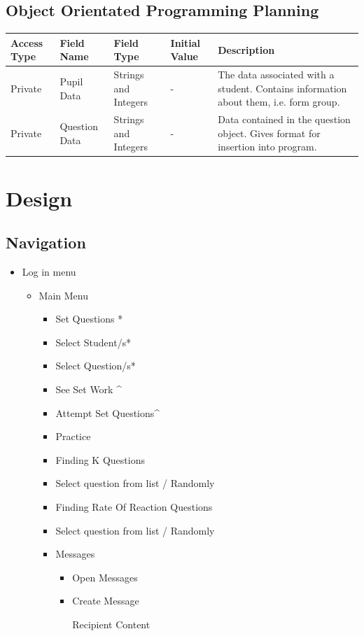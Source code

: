 \documentclass[a4paper,12pt]{report}
\begin{document}
\section{Object Orientated Programming Planning}

\begin{flushleft}
\tablefirsthead{}
\tablehead{}
\tabletail{}
\tablelasttail{}
\begin{supertabular}{|m{0.81435984in}|m{1.0191599in}|m{0.8469598in}|m{0.9038598in}|m{2.43586in}|}
\hline
Access Type &
Field Name &
Field Type &
Initial Value &
Description\\\hline
Private &
Pupil Data &
Strings and Integers &
{}- &
The data associated with a student. Contains information about them, i.e. form group.\\\hline
Private &
Question Data &
Strings and Integers &
{}- &
Data contained in the question object. Gives format for insertion into program.\\\hline


\end{supertabular}
\end{flushleft}

\chapter{Design}
\section{Navigation}

\begin{itemize}
\item Log in menu

\begin{itemize}
\item Main Menu

\begin{itemize}
\item Set Questions *
\item Select Student/s*
\item Select Question/s*
\item See Set Work \^{}
\item Attempt Set Questions\^{}
\item Practice
\item Finding K Questions
\item Select question from list / Randomly
\item Finding Rate Of Reaction Questions
\item Select question from list / Randomly
\item Messages

\begin{itemize}
\item Open Messages
\item Create Message

Recipient
Content
\end{itemize}
\end{itemize}
\end{itemize}
\end{itemize}
\end{document}

